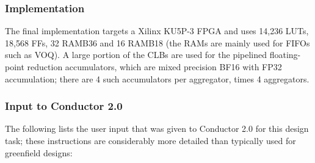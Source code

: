 \subsubsection{Implementation}

The final implementation targets a Xilinx KU5P-3 FPGA and uses 14,236 LUTs, 18,568 FFs, 32 RAMB36 and 16 RAMB18 (the RAMs are mainly used for FIFOs such as VOQ).
A large portion of the CLBs are used for the pipelined floating-point reduction accumulators, which are mixed precision BF16 with FP32 accumulation; there are 4 such accumulators per aggregator, times 4 aggregators.

\subsubsection{Input to Conductor 2.0}

The following lists the user input that was given to Conductor 2.0 for this design task; these instructions are considerably more detailed than typically used for greenfield designs:

